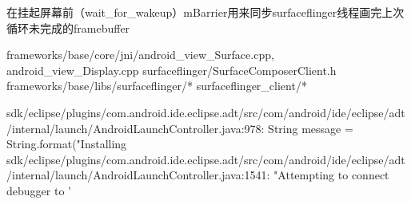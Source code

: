 \documentclass{book}
\begin{document}
\begin{CJK}{UTF8}{gbsn}
在挂起屏幕前（wait_for_wakeup）mBarrier用来同步surfaceflinger线程画完上次循环未完成的framebuffer

frameworks/base/core/jni/android_view_Surface.cpp, android_view_Display.cpp
surfaceflinger/SurfaceComposerClient.h
frameworks/base/libs/surfaceflinger/*
                     surfaceflinger_client/*


sdk/eclipse/plugins/com.android.ide.eclipse.adt/src/com/android/ide/eclipse/adt/internal/launch/AndroidLaunchController.java:978:        String message = String.format("Installing %
sdk/eclipse/plugins/com.android.ide.eclipse.adt/src/com/android/ide/eclipse/adt/internal/launch/AndroidLaunchController.java:1541:                                "Attempting to connect debugger to '%


\end{CJK}
\end{document}
